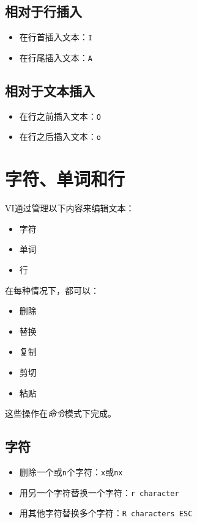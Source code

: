 \documentclass[12pt,a4paper,twoside]{ctexbook}
\begin{document}
\subsection{相对于行插入}

\begin{itemize}
    \item 在行首插入文本：\texttt{I}
    \item 在行尾插入文本：\texttt{A}
\end{itemize}

\subsection{相对于文本插入}

\begin{itemize}
    \item 在行之前插入文本：\texttt{O}
    \item 在行之后插入文本：\texttt{o}
\end{itemize}

\section{字符、单词和行}

VI通过管理以下内容来编辑文本：

\begin{itemize}
    \item 字符
    \item 单词
    \item 行
\end{itemize}

在每种情况下，都可以：

\begin{itemize}
    \item 删除
    \item 替换
    \item 复制
    \item 剪切
    \item 粘贴
\end{itemize}

这些操作在\textit{命令}模式下完成。

\subsection{字符}

\begin{itemize}
    \item 删除一个或\texttt{n}个字符：\texttt{x}或\texttt{nx}
    \item 用另一个字符替换一个字符：\texttt{r character}
    \item 用其他字符替换多个字符：\texttt{R characters ESC}
\end{itemize}
\end{document}
